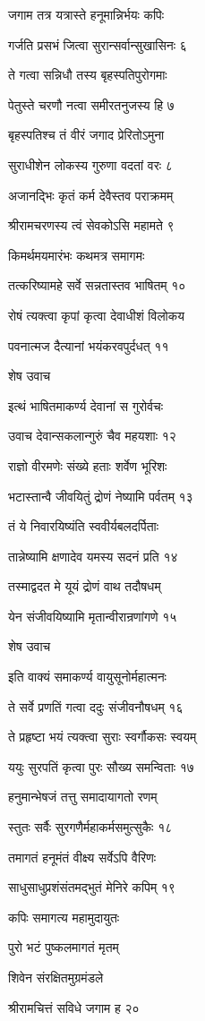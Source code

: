 जगाम तत्र यत्रास्ते हनूमान्निर्भयः कपिः

गर्जति प्रसभं जित्वा सुरान्सर्वान्सुखासिनः ६

ते गत्वा सन्निधौ तस्य बृहस्पतिपुरोगमाः

पेतुस्ते चरणौ नत्वा समीरतनुजस्य हि ७

बृहस्पतिश्च तं वीरं जगाद प्रेरितोऽमुना

सुराधीशेन लोकस्य गुरुणा वदतां वरः ८

अजानद्भिः कृतं कर्म देवैस्तव पराक्रमम्

श्रीरामचरणस्य त्वं सेवकोऽसि महामते ९

किमर्थमयमारंभः कथमत्र समागमः

तत्करिष्यामहे सर्वे सन्नतास्तव भाषितम् १०

रोषं त्यक्त्वा कृपां कृत्वा देवाधीशं विलोकय

पवनात्मज दैत्यानां भयंकरवपुर्दधत् ११

शेष उवाच

इत्थं भाषितमाकर्ण्य देवानां स गुरोर्वचः

उवाच देवान्सकलान्गुरुं चैव महयशाः १२

राज्ञो वीरमणेः संख्ये हताः शर्वेण भूरिशः

भटास्तान्वै जीवयितुं द्रोणं नेष्यामि पर्वतम् १३

तं ये निवारयिष्यंति स्ववीर्यबलदर्पिताः

तान्नेष्यामि क्षणादेव यमस्य सदनं प्रति १४

तस्माद्वदत मे यूयं द्रोणं वाथ तदौषधम्

येन संजीवयिष्यामि मृतान्वीरान्रणांगणे १५

शेष उवाच

इति वाक्यं समाकर्ण्य वायुसूनोर्महात्मनः

ते सर्वे प्रणतिं गत्वा ददुः संजीवनौषधम् १६

ते प्रहृष्टा भयं त्यक्त्वा सुराः स्वर्गौकसः स्वयम्

ययुः सुरपतिं कृत्वा पुरः सौख्य समन्विताः १७

हनुमान्भेषजं तत्तु समादायागतो रणम्

स्तुतः सर्वैः सुरगणैर्महाकर्मसमुत्सुकैः १८

तमागतं हनूमंतं वीक्ष्य सर्वेऽपि वैरिणः

साधुसाधुप्रशंसंतमद्भुतं मेनिरे कपिम् १९

कपिः समागत्य महामुदायुतः

पुरो भटं पुष्कलमागतं मृतम्

शिवेन संरक्षितमुग्रमंडले

श्रीरामचित्तं सविधे जगाम ह २०

